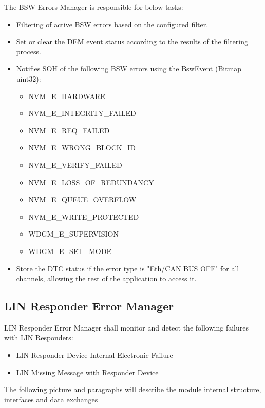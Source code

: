 The BSW Errors Manager is responsible for below tasks:

\begin{itemize}
    \item Filtering of active BSW errors based on the configured filter.
    \item Set or clear the DEM event status according to the results of the filtering process.
	\item Notifies SOH of the following BSW errors using the BswEvent (Bitmap uint32):
	\begin{itemize}	
		\item NVM_E_HARDWARE
		\item NVM_E_INTEGRITY_FAILED
		\item NVM_E_REQ_FAILED
		\item NVM_E_WRONG_BLOCK_ID
		\item NVM_E_VERIFY_FAILED
		\item NVM_E_LOSS_OF_REDUNDANCY
		\item NVM_E_QUEUE_OVERFLOW
		\item NVM_E_WRITE_PROTECTED
		\item WDGM_E_SUPERVISION
		\item WDGM_E_SET_MODE
	\end{itemize}
	\item Store the DTC status if the error type is "Eth/CAN BUS OFF" for all channels, allowing the rest of the application to access it.
\end{itemize}


{         }


\subsection{LIN Responder Error Manager}
LIN Responder Error Manager shall monitor and detect the following failures with LIN Responders:
\begin{itemize}
    \item LIN Responder Device Internal Electronic Failure
    \item LIN Missing Message with Responder Device
\end{itemize}
The following picture and paragraphs will describe the module internal structure, interfaces and data
exchanges

